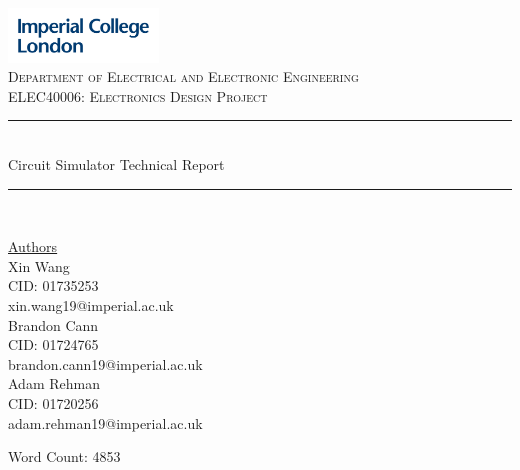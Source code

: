 \documentclass[12pt,a4paper]{article}
\begin{document}
\begin{titlepage}
	\newcommand{\HRule}{\rule{\linewidth}{0.5mm}}
    \includegraphics[width = 4cm]{./Images/Logo.jpg}\\[0.5cm] 
    
    \center 
	\textsc{\large Department of Electrical and Electronic Engineering }\\[0.5cm] 
	\textsc{\normalsize ELEC40006: Electronics Design Project}\\[0.5cm] 
    
	\HRule \\[0.4cm]
	Circuit Simulator Technical Report
    \HRule \\[1.5cm]
     
    \begin{center}
		\underline{Authors}\\[0.5cm] Xin Wang\\CID: 01735253\\xin.wang19@imperial.ac.uk \\[0.5cm]
		Brandon Cann\\ CID: 01724765\\ brandon.cann19@imperial.ac.uk\\[0.5cm]
		Adam Rehman\\ CID: 01720256\\adam.rehman19@imperial.ac.uk\\[0.5cm]
	\end{center} \large
    
    \vfill %
 	\small Word Count: 4853 \\ [0.5cm]
    \makeatletter
    \@date 
    \makeatother
\end{titlepage}

\tableofcontents
\pagebreak
\end{document}
